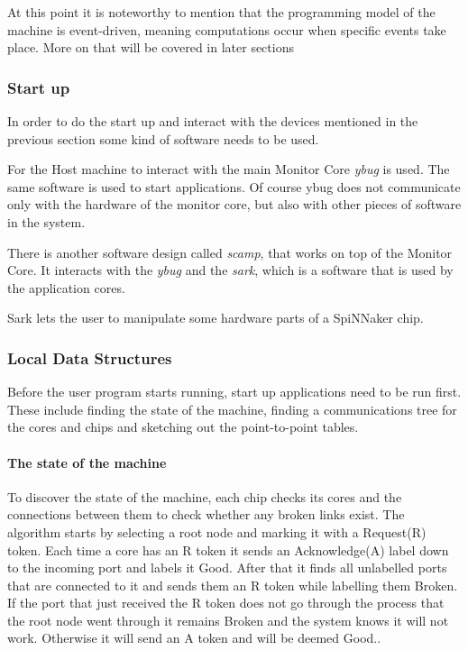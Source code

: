 \documentclass[12pt,twosided]{article}
\begin{document}
At this point it is noteworthy to mention that the programming model of the machine is event-driven, meaning computations occur when specific events take place. More on that will be covered in later sections
\subsubsection{Start up}
In order to do the start up and interact with the devices mentioned in the previous section some kind of software needs to be used.

For the Host machine to interact with the main Monitor Core \emph{ybug} is used. The same software is used to start applications. Of course ybug does not communicate only with the hardware of the monitor core, but also with other pieces of software in the system. 

There is another software design called \emph{scamp}, that works on top of the Monitor Core. It interacts with the \emph{ybug} and the \emph{sark}, which is a software that is used by the application cores. 

Sark lets the user to manipulate some hardware parts of a SpiNNaker chip.\cite{spinnweb}
\subsubsection{Local Data Structures}
Before the user program starts running, start up applications need to be run first. These include finding the state of the machine, finding a communications tree for the cores and chips and sketching out the point-to-point tables.

\paragraph{The state of the machine}
To discover the state of the machine, each chip checks its cores and the connections between them to check whether any broken links exist. The algorithm starts by selecting a root node and marking it with a Request(R) token. Each time a core has an R token it sends an Acknowledge(A) label down to the incoming port and labels it Good. After that it finds all unlabelled ports that are connected to it and sends them an R token while labelling them Broken. If the port that just received the R token does not go through the process that the root node went through it remains Broken and the system knows it will not work. Otherwise it will send an A token and will be deemed Good.\cite{jefflec}.
\end{document}

